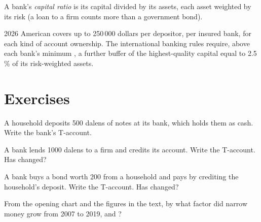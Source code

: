 \begin{definition}\label{def:g11:money-and-banking:capital-ratio}
A bank's \emph{capital ratio} is its capital divided by its assets, each asset weighted by its risk (a loan to a firm counts more than a
government bond).
\end{definition}

\begin{dated}{2026}
American  covers up to 250\,000 dollars per depositor, per insured bank, for each kind of account ownership. The international banking rules require,
above each bank's minimum , a further buffer of the highest-quality capital equal to 2.5\,\% of its risk-weighted assets.
\end{dated}

\section{Exercises}

\begin{exercise}[$\star$]\label{exo:g11:money-and-banking:1}
A household deposits 500 dalens of notes at its bank, which holds them as cash. Write the bank's T-account.
\end{exercise}

\begin{exercise}[$\star$]\label{exo:g11:money-and-banking:2}
A bank lends 1000 dalens to a firm and credits its account. Write the T-account. Has  changed?
\end{exercise}

\begin{exercise}[$\star$]\label{exo:g11:money-and-banking:3}
A bank buys a bond worth 200 from a household and pays by crediting the household's deposit. Write the T-account. Has  changed?
\end{exercise}

\begin{exercise}[$\star$]\label{exo:g11:money-and-banking:4}
From the opening chart and the figures in the text, by what factor did narrow money grow from 2007 to 2019, and ?
\end{exercise}


